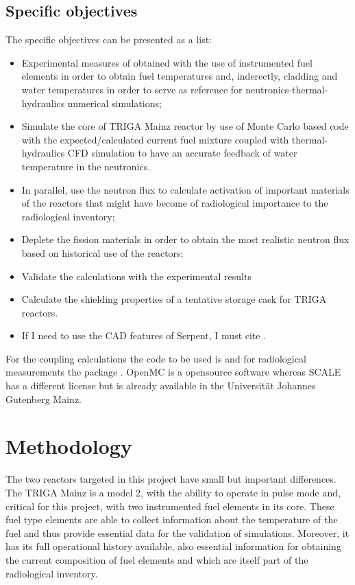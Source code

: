 \documentclass[11pt]{article} %
\begin{document}
\subsection{Specific objectives}

The specific objectives can be presented as a list:
\begin{itemize}
  \item  Experimental measures of obtained with the use of instrumented fuel elements in order to obtain fuel temperatures and, inderectly, cladding and water temperatures in order to serve as reference for neutronics-thermal-hydraulics numerical simulations;
  \item Simulate the core of TRIGA Mainz reactor by use of Monte Carlo based code with the expected/calculated current fuel mixture coupled with thermal-hydraulics CFD simulation to have an accurate feedback of water temperature in the neutronics. 
  \item In parallel, use the neutron flux to calculate activation of important materials of the reactors that might have become of radiological importance to the radiological inventory;
  \item Deplete the fission materials in order to obtain the most realistic neutron flux based on historical use of the reactors;
  \item Validate the calculations with the experimental results
  \item Calculate the shielding properties of a tentative storage cask for TRIGA reactors.
    \item If I need to use the CAD features of Serpent, I must cite \cite{Leppanen_2022}.
\end{itemize}

For the coupling calculations the code to be used is \cite{OpenMC_2015} and for radiological measurements the package \cite{SCALE_632}. OpenMC is a opensource software whereas SCALE has a different license but is already available in the Universität Johannes Gutenberg Mainz.

\section{Methodology}

The two reactors targeted in this project have small but important differences. The TRIGA Mainz is a model 2, with the ability to operate in pulse mode and, critical for this project, with two instrumented fuel elements in its core. These fuel type elements are able to collect information about the temperature of the fuel and thus provide essential data for the validation of simulations. Moreover, it has its full operational history available, also essential information for obtaining the current composition of fuel elements and which are itself part of the radiological inventory.
\end{document}
